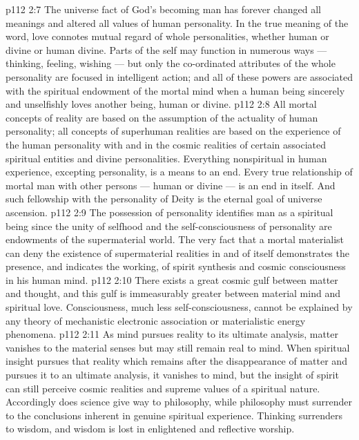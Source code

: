 \vs p112 2:7 \pc The universe fact of God’s becoming man has forever changed all meanings and altered all values of human personality. In the true meaning of the word, love connotes mutual regard of whole personalities, whether human or divine or human  divine. Parts of the self may function in numerous ways --- thinking, feeling, wishing --- but only the co\hyp{}ordinated attributes of the whole personality are focused in intelligent action; and all of these powers are associated with the spiritual endowment of the mortal mind when a human being sincerely and unselfishly loves another being, human or divine.
\vs p112 2:8 All mortal concepts of reality are based on the assumption of the actuality of human personality; all concepts of superhuman realities are based on the experience of the human personality with and in the cosmic realities of certain associated spiritual entities and divine personalities. Everything nonspiritual in human experience, excepting personality, is a means to an end. Every true relationship of mortal man with other persons --- human or divine --- is an end in itself. And such fellowship with the personality of Deity is the eternal goal of universe ascension.
\vs p112 2:9 The possession of personality identifies man as a spiritual being since the unity of selfhood and the self\hyp{}consciousness of personality are endowments of the supermaterial world. The very fact that a mortal materialist can deny the existence of supermaterial realities in and of itself demonstrates the presence, and indicates the working, of spirit synthesis and cosmic consciousness in his human mind.
\vs p112 2:10 There exists a great cosmic gulf between matter and thought, and this gulf is immeasurably greater between material mind and spiritual love. Consciousness, much less self\hyp{}consciousness, cannot be explained by any theory of mechanistic electronic association or materialistic energy phenomena.
\vs p112 2:11 \pc As mind pursues reality to its ultimate analysis, matter vanishes to the material senses but may still remain real to mind. When spiritual insight pursues that reality which remains after the disappearance of matter and pursues it to an ultimate analysis, it vanishes to mind, but the insight of spirit can still perceive cosmic realities and supreme values of a spiritual nature. Accordingly does science give way to philosophy, while philosophy must surrender to the conclusions inherent in genuine spiritual experience. Thinking surrenders to wisdom, and wisdom is lost in enlightened and reflective worship.
